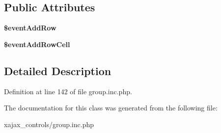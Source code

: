 \subsection*{Public Attributes}
\begin{DoxyCompactItemize}
\item 
\hypertarget{classclsTableRowContainer_a40496566b86f2b4c0ba8e2858c73143a}{
{\bfseries \$eventAddRow}}
\label{classclsTableRowContainer_a40496566b86f2b4c0ba8e2858c73143a}

\item 
\hypertarget{classclsTableRowContainer_a25b9da541f5706730a07984a09b291ae}{
{\bfseries \$eventAddRowCell}}
\label{classclsTableRowContainer_a25b9da541f5706730a07984a09b291ae}

\end{DoxyCompactItemize}


\subsection{Detailed Description}


Definition at line 142 of file group.inc.php.



The documentation for this class was generated from the following file:\begin{DoxyCompactItemize}
\item 
xajax\_\-controls/group.inc.php\end{DoxyCompactItemize}
